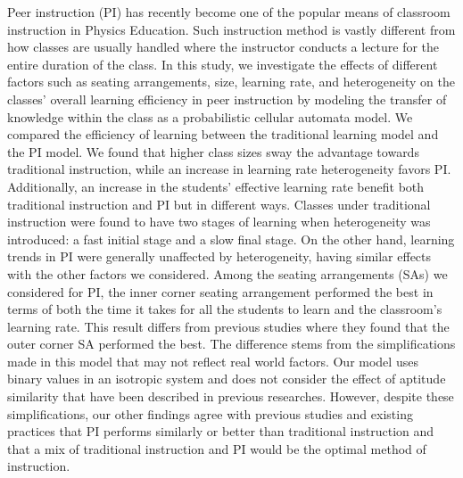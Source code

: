 Peer instruction (PI) has recently become one of the popular means of classroom instruction in Physics Education. 
Such instruction method is vastly different from how classes are usually handled where the instructor conducts a lecture for the entire duration of the class.
In this study, we investigate the effects of different factors such as seating arrangements, size, learning rate, and heterogeneity on the classes' overall learning efficiency in peer instruction by modeling the transfer of knowledge within the class as a probabilistic cellular automata model. 
We compared the efficiency of learning between the traditional learning model and the PI model. 
We found that higher class sizes sway the advantage towards traditional instruction, while an increase in learning rate heterogeneity favors PI.
Additionally, an increase in the students' effective learning rate benefit both traditional instruction and PI but in different ways.
Classes under traditional instruction were found to have two stages of learning when heterogeneity was introduced: a fast initial stage and a slow final stage.
On the other hand, learning trends in PI were generally unaffected by heterogeneity, having similar effects with the other factors we considered.
Among the seating arrangements (SAs) we considered for PI, the inner corner seating arrangement performed the best in terms of both the time it takes for all the students to learn and the classroom’s learning rate.
This result differs from previous studies where they found that the outer corner SA performed the best.
The difference stems from the simplifications made in this model that may not reflect real world factors. Our model uses binary values in an isotropic system and does not consider the effect of aptitude similarity that have been described in previous researches. 
However, despite these simplifications, our other findings agree with previous studies and existing practices that PI performs similarly or better than traditional instruction and that a mix of traditional instruction and PI would be the optimal method of instruction.

